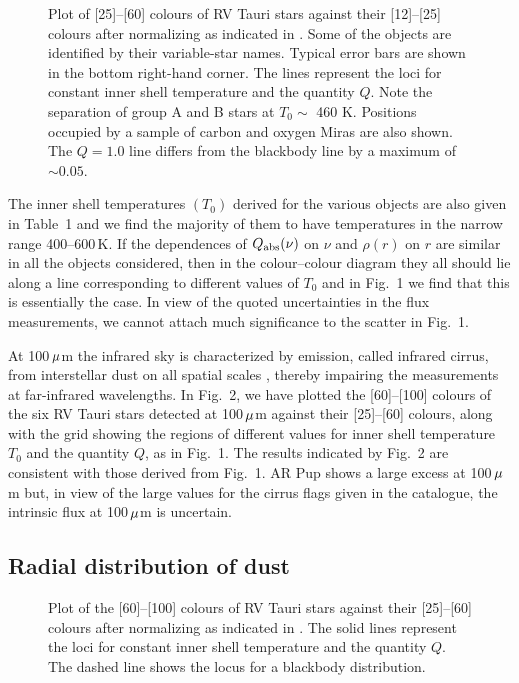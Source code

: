 \documentclass[useAMS,usenatbib]{mn2e}
\begin{document}
\begin{figure}
 \vspace{302pt}
 \caption{Plot of [25]--[60] colours of RV  Tauri stars against their
  [12]--[25] colours after  normalizing as indicated in \citet{b3}.
  Some of the objects are identified by their variable-star
  names. Typical error bars are shown in the bottom right-hand corner.
  The lines represent the loci for constant inner shell temperature and
  the quantity $Q$. Note the separation of group A and B stars at $T_0
  \sim$ 460$\,$\,K. Positions occupied by a sample of carbon and oxygen
  Miras are also shown. The $Q=1.0$ line differs from the blackbody line
  by a maximum of $\sim 0.05$.}
\end{figure}
The inner shell temperatures $(T_0)$ derived for the various objects
are also given in Table~1 and we find the majority of them to have
temperatures in the narrow range 400--600$\,$K. If the dependences of
$Q_{{\mathrm{abs}}}(\nu)$ on $\nu$ and $\rho(r)$ on $r$ are similar in all
the objects considered, then in the colour--colour diagram they all
should lie along a line corresponding to different values of $T_0$ and
in Fig.~1 we find that this is essentially the  case. In view of the
quoted uncertainties in the flux measurements, we cannot attach much
significance to the scatter in Fig.~1.

At \hbox{100\,$\mu$m} the infrared sky is characterized by
emission, called infrared cirrus, from interstellar dust on all
spatial scales \citep{b16}, thereby impairing the measurements at
far-infrared wavelengths. In Fig.~2, we have plotted the
[60]--[100] colours of the six RV Tauri stars detected at
\hbox{100\,$\mu$m} against their [25]--[60] colours, along with
the grid showing the regions of different values for inner shell
temperature $T_0$ and the quantity $Q$, as in Fig.~1. The results
indicated by Fig.~2 are consistent with those derived from Fig.~1.
AR Pup shows a large excess at \hbox{100\,$\mu$m} but, in view of
the large values for the cirrus flags given in the catalogue, the
intrinsic flux at \hbox{100\,$\mu$m} is uncertain.

\subsection{Radial distribution of dust}

\begin{figure*}
  \vspace*{174pt}
  \caption{Plot of the [60]--[100] colours of RV Tauri stars against
  their [25]--[60] colours after normalizing as indicated in \citet{b3}.
  The solid lines represent the loci for constant
  inner shell temperature and the quantity $Q$. The dashed line shows
  the locus for a blackbody distribution.}
\end{figure*}
\end{document}
